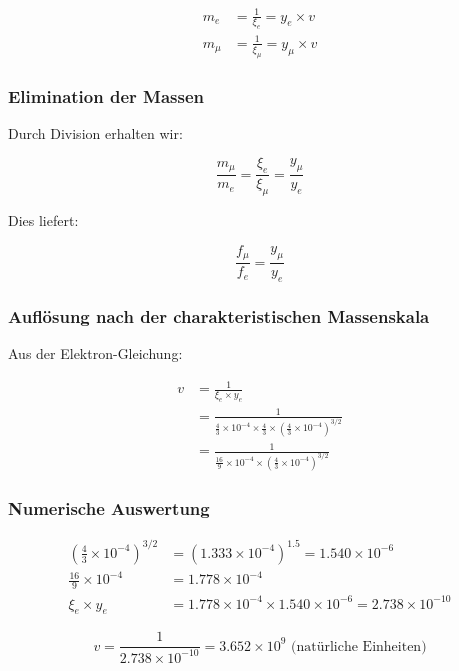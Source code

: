 \begin{align}
	m_e &= \frac{1}{\xi_e} = y_e \times v\\
	m_\mu &= \frac{1}{\xi_\mu} = y_\mu \times v
\end{align}

\subsubsection{Elimination der Massen}

Durch Division erhalten wir:

\begin{equation}
	\frac{m_\mu}{m_e} = \frac{\xi_e}{\xi_\mu} = \frac{y_\mu}{y_e}
\end{equation}

Dies liefert:

\begin{equation}
	\frac{f_\mu}{f_e} = \frac{y_\mu}{y_e}
\end{equation}

\subsubsection{Auflösung nach der charakteristischen Massenskala}

Aus der Elektron-Gleichung:

\begin{align}
	v &= \frac{1}{\xi_e \times y_e}\\
	&= \frac{1}{\frac{4}{3} \times 10^{-4} \times \frac{4}{3} \times \left(\frac{4}{3} \times 10^{-4}\right)^{3/2}}\\
	&= \frac{1}{\frac{16}{9} \times 10^{-4} \times \left(\frac{4}{3} \times 10^{-4}\right)^{3/2}}
\end{align}

\subsubsection{Numerische Auswertung}

\begin{align}
	\left(\frac{4}{3} \times 10^{-4}\right)^{3/2} &= (1.333 \times 10^{-4})^{1.5} = 1.540 \times 10^{-6}\\
	\frac{16}{9} \times 10^{-4} &= 1.778 \times 10^{-4}\\
	\xi_e \times y_e &= 1.778 \times 10^{-4} \times 1.540 \times 10^{-6} = 2.738 \times 10^{-10}
\end{align}

\begin{equation}
	v = \frac{1}{2.738 \times 10^{-10}} = 3.652 \times 10^9 \text{ (natürliche Einheiten)}
\end{equation}

